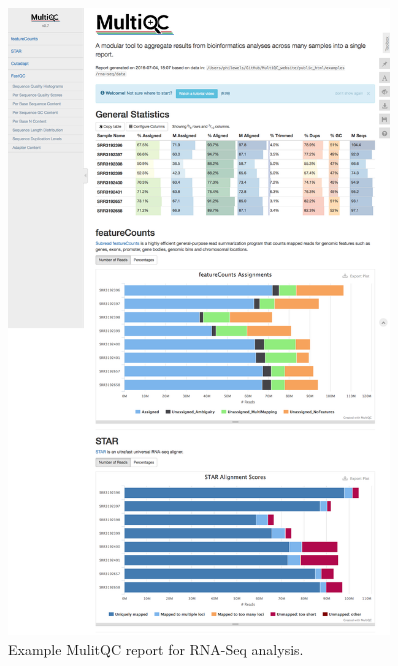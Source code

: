 \begin{figure}[p]
\centering
\includegraphics[width=0.9\textwidth]{images/multiqc_report}
\caption[Example MultiQC report]{
    Example MulitQC report for RNA-Seq analysis.
}
\label{fig:multiqc-report}
\end{figure}


